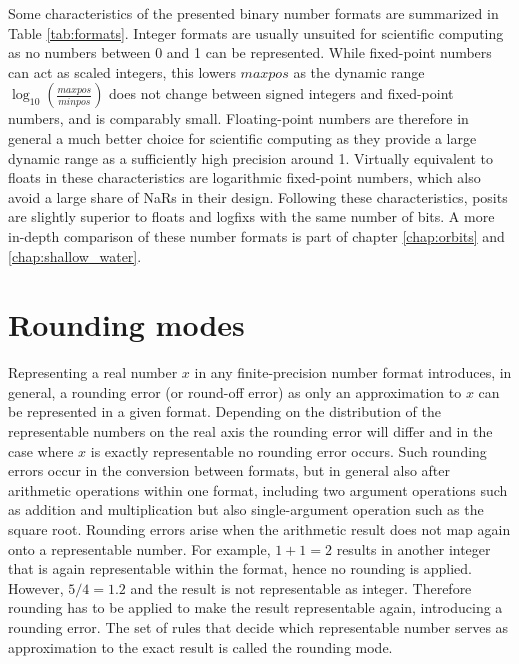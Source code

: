 Some characteristics of the presented binary number formats are summarized in Table \ref{tab:formats}. Integer formats are usually
unsuited for scientific computing as no numbers between 0 and 1 can be represented. While fixed-point numbers can act as
scaled integers, this lowers $maxpos$ as the dynamic range $\log_{10}(\tfrac{maxpos}{minpos})$ does not change between signed
integers and fixed-point numbers, and is comparably small. Floating-point numbers are therefore in general a much better
choice for scientific computing as they provide a large dynamic range as a sufficiently high precision around 1. Virtually equivalent
to floats in these characteristics are logarithmic fixed-point numbers, which also avoid a large share of NaRs in their design.
Following these characteristics, posits are slightly superior to floats and logfixs with the same number of bits. A more in-depth
comparison of these number formats is part of chapter \ref{chap:orbits} and \ref{chap:shallow_water}.

\section{Rounding modes}
\label{sec:rounding}

Representing a real number $x$ in any finite-precision number format introduces, in general, a rounding error (or round-off error) as
only an approximation to $x$ can be represented in a given format. Depending on the distribution of the representable numbers on the
real axis the rounding error will differ and in the case where $x$ is exactly representable no rounding error occurs. Such rounding errors
occur in the conversion between formats, but in general also after arithmetic operations within one format, including two argument
operations such as addition and multiplication but also single-argument operation such as the square root. Rounding errors arise when
the arithmetic result does not map again onto a representable number. For example, $1+1 = 2$ results in another integer that is again
representable within the format, hence no rounding is applied. However, $5/4 = 1.2$ and the result is not representable as integer.
Therefore rounding has to be applied to make the result representable again, introducing a rounding error. The set of rules that decide
which representable number serves as approximation to the exact result is called the rounding mode.


